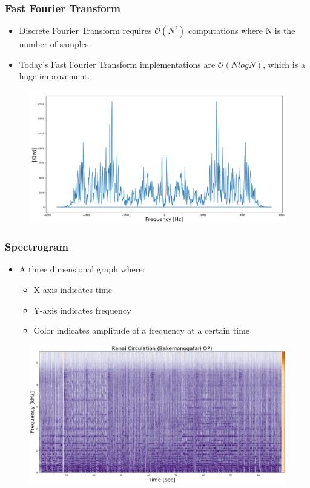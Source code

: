 \documentclass{beamer}
\begin{document}
\begin{frame}[t]
    \frametitle{Fast Fourier Transform}
    \begin{itemize}
        \item Discrete Fourier Transform requires \(\mathcal{O}(N^2)\) computations where N is the number of samples.
        \item Today's Fast Fourier Transform implementations are \(\mathcal{O}(NlogN)\), which is a huge improvement.
    \end{itemize}
    \vspace{-0.3cm}
    \begin{figure}
        \centering
        \includegraphics[width=\textwidth]{fft.png}
    \end{figure}
\end{frame}

\begin{frame}[t]
    \frametitle{Spectrogram}
    \begin{itemize}
        \item A three dimensional graph where:
        \begin{itemize}
            \item X-axis indicates time
            \item Y-axis indicates frequency
            \item Color indicates amplitude of a frequency at a certain time
        \end{itemize}
    \end{itemize}
    \vspace{-0.6cm}
    \begin{figure}
        \centering
        \includegraphics[width=1.000325\textwidth]{Spectrogram_Specimens/ActualSong.png}
    \end{figure}
\end{frame}
\end{document}
